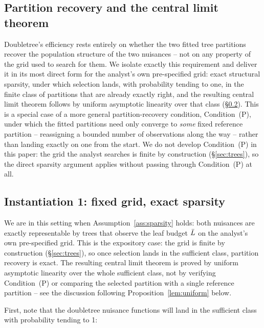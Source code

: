 \documentclass[12pt]{article}
\begin{document}
\subsection{Partition recovery and the central limit theorem}
\label{sec:partition-recovery}

Doubletree's efficiency rests entirely on whether the two fitted tree
partitions recover the population structure of the two nuisances -- not on
any property of the grid used to search for them. We isolate exactly this
requirement and deliver it in its most direct form for the analyst's own
pre-specified grid: exact structural sparsity, under which selection lands,
with probability tending to one, in the finite class of partitions that are
already exactly right, and the resulting central limit theorem follows by
uniform asymptotic linearity over that class
(\S\ref{sec:instantiation1}). This is a special case of a more general
partition-recovery condition, Condition~(P), under which the fitted
partitions need only converge to \emph{some} fixed reference partition --
reassigning a bounded number of observations along the way -- rather than
landing exactly on one from the start. We do not develop Condition~(P) in
this paper: the grid the analyst
searches is finite by construction (\S\ref{sec:trees}), so the direct
sparsity argument applies without passing through Condition~(P) at all.

\subsection{Instantiation 1: fixed grid, exact sparsity}
\label{sec:instantiation1}

We are in this setting when Assumption~\ref{ass:sparsity} holds: both
nuisances are exactly representable by trees that observe the leaf budget
$\bar{L}$ on the analyst's own pre-specified grid. This is the expository
case: the grid is finite by construction (\S\ref{sec:trees}), so once
selection lands in the sufficient class, partition recovery is exact. The resulting central
limit theorem is proved by uniform asymptotic linearity over the whole
sufficient class, not by verifying Condition~(P) or comparing the selected
partition with a single reference partition -- see the discussion following
Proposition~\ref{lem:uniform} below.

First, note that the doubletree nuisance functions will land in the
sufficient class with probability tending to 1:
\end{document}
